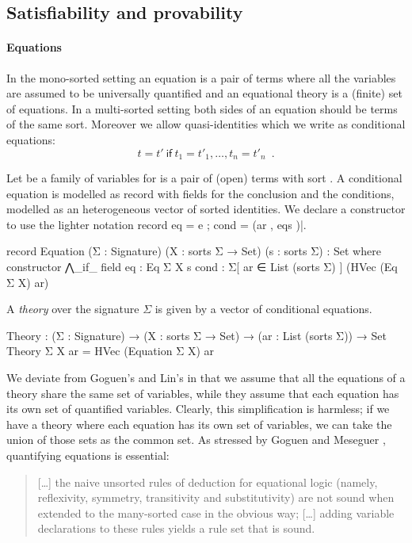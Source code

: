 \subsection{Satisfiability and provability}

\paragraph*{Equations} In the mono-sorted setting an equation is a pair
of terms where all the variables are assumed to be universally
quantified and an equational theory is a (finite) set of equations.
In a  multi-sorted setting both sides of an equation should be terms
of the same sort. Moreover we allow quasi-identities which we
write as conditional equations:
\[ t = t'\ \mathsf{if} \  t_1 = t'_1, \ldots, t_n = t'_n \enspace . \]

Let  be a family of
variables for  is a pair of (open)
terms with sort . A conditional equation is modelled as record with
fields for the conclusion and the conditions, modelled as an
heterogeneous vector of sorted identities. We declare a constructor
to use the lighter notation record {
  eq = e ; cond = (ar , eqs )}|.
\begin{spec}
record Equation (Σ : Signature) (X : sorts Σ → Set) (s : sorts Σ) : Set where
  constructor ⋀_if_
  field
    eq     :   Eq Σ X s
    cond   :   Σ[ ar ∈ List (sorts Σ) ] (HVec (Eq Σ X) ar)
\end{spec}
\noindent A \emph{theory} over the signature $\Sigma$ is given by a
vector of conditional equations.
\begin{spec}
Theory : (Σ : Signature) → (X : sorts Σ → Set) → (ar : List (sorts Σ)) → Set
Theory Σ X ar = HVec (Equation Σ X) ar
\end{spec}
We deviate from Goguen's and Lin's in that we assume that all the
equations of a theory share the same set of variables, while they
assume that each equation has its own set of quantified
variables. Clearly, this simplification is harmless; if we have a
theory where each equation has its own set of variables, we can take
the union of those sets as the common set. As stressed by Goguen and
Meseguer \cite{goguen-remarks-87}, quantifying equations is essential:
\begin{quote}
  [\ldots] the naive unsorted rules of deduction for equational logic
  (namely, reflexivity, symmetry, transitivity and substitutivity) are
  not sound when extended to the many-sorted case in the obvious way;
  [\ldots] adding variable declarations to these rules
  yields a rule set that is sound.
\end{quote}

